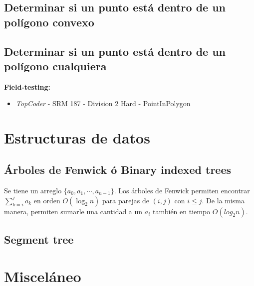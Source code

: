 \documentclass[10pt,letterpaper]{article}
\begin{document}
\subsection{Determinar si un punto está dentro de un polígono convexo}

\subsection{Determinar si un punto está dentro de un polígono cualquiera}
\small
\textbf{Field-testing:} 
\begin{itemize}
\item \emph{TopCoder} -  SRM 187 - Division 2 Hard - PointInPolygon
\end{itemize}

\section{Estructuras de datos}
\subsection{Árboles de Fenwick ó Binary indexed trees}

Se tiene un arreglo $\{a_0, a_1, \cdots, a_{n-1}\}$. Los árboles
de Fenwick permiten encontrar $ \displaystyle \sum_{k=i}^{j} a_k $ en orden $O(\log_{2}{n})$ para parejas de $(i, j)$ con $i \leq j$. De la misma manera, permiten sumarle una cantidad a un $a_i$ también en tiempo $O(log_{2}{n})$.
\medskip

\subsection{Segment tree}

\section{Misceláneo}
\end{document}

